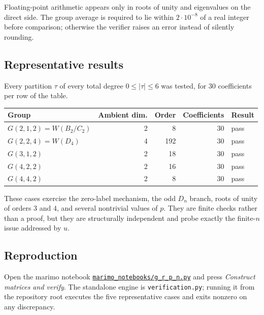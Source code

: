 \documentclass[10pt]{article}
\begin{document}
Floating-point arithmetic appears only in roots of unity and eigenvalues on the
direct side.  The group average is required to lie within $2\cdot10^{-8}$ of a
real integer before comparison; otherwise the verifier raises an error instead
of silently rounding.

\subsection{Representative results}

Every partition $\tau$ of every total degree $0\leq|\tau|\leq6$ was tested, for
30 coefficients per row of the table.

\begin{center}
\begin{tabular}{@{}lrrrl@{}}
\toprule
Group & Ambient dim. & Order & Coefficients & Result\\
\midrule
$G(2,1,2)=W(B_2/C_2)$ & 2 & 8 & 30 & pass\\
$G(2,2,4)=W(D_4)$ & 4 & 192 & 30 & pass\\
$G(3,1,2)$ & 2 & 18 & 30 & pass\\
$G(4,2,2)$ & 2 & 16 & 30 & pass\\
$G(4,4,2)$ & 2 & 8 & 30 & pass\\
\bottomrule
\end{tabular}
\end{center}

These cases exercise the zero-label mechanism, the odd $D_n$ branch, roots of
unity of orders $3$ and $4$, and several nontrivial values of $p$.  They are
finite checks rather than a proof, but they are structurally independent and
probe exactly the finite-$n$ issue addressed by $u$.

\subsection{Reproduction}

Open the marimo notebook
\href{run:marimo_notebooks/g_r_p_n.py}
{\texttt{marimo\_notebooks/g\_r\_p\_n.py}} and press
\emph{Construct matrices and verify}.  The standalone engine is
\texttt{verification.py}; running it from the repository root executes the five
representative cases and exits nonzero on any discrepancy.
\endgroup


\clearpage
\end{document}
